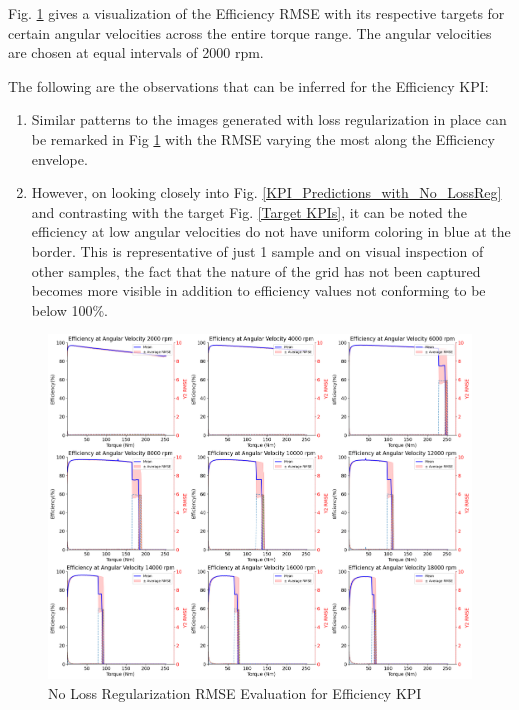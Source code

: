 \documentclass{report} %
\begin{document}
Fig. \ref{fig:No Loss Regularization RMSE Evaluation for Efficiency KPI} gives a visualization of the Efficiency \ac{RMSE} with its respective targets 
for certain angular velocities across the entire torque range. The angular velocities are chosen at equal intervals of 2000 rpm.

The following are the observations that can be inferred for the Efficiency \ac{KPI}:
\begin{enumerate}[nosep]
    \item Similar patterns to the images generated with loss regularization in place can be remarked 
    in Fig \ref{fig:No Loss Regularization RMSE Evaluation for Efficiency KPI} with the \ac{RMSE} varying the most along the Efficiency envelope.
    \item However, on looking closely into Fig. \ref{KPI_Predictions_with_No_LossReg} and contrasting with the target Fig. \ref{Target KPIs}, it can be noted the efficiency 
    at low angular velocities do not have uniform coloring in blue at the border. This is representative of just 1 sample and on visual inspection of other samples, the fact that the 
    nature of the grid has not been captured becomes more visible in addition to efficiency values not conforming to be below 100\%.\\
\end{enumerate}

\begin{figure}[H]
    \centering
    \includegraphics[width=1\textwidth]{./ReportImages/rmse_eta_no_lossreg_MLP.png} 
    \caption{No Loss Regularization \ac{RMSE} Evaluation for Efficiency \ac{KPI}} 
    \label{fig:No Loss Regularization RMSE Evaluation for Efficiency KPI}
\end{figure}
\end{document}
